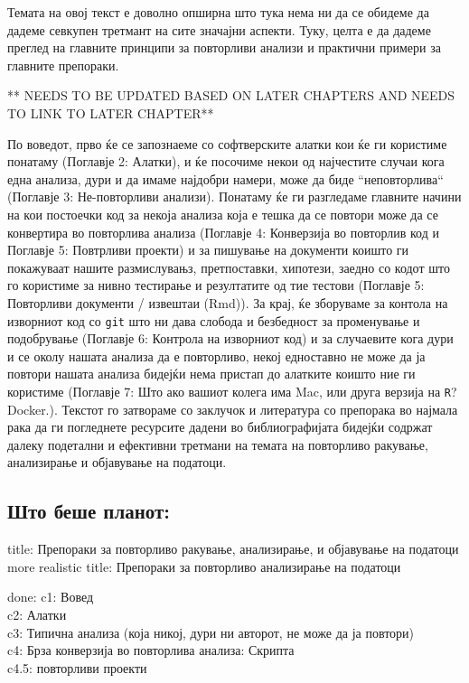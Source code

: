 \documentclass[
]{book}
\begin{document}
Темата на овој текст е доволно опширна што тука нема ни да се обидеме да дадеме севкупен третмант на сите значајни аспекти. Туку, целта е да дадеме преглед на главните принципи за повторливи анализи и практични примери за главните препораки.

** NEEDS TO BE UPDATED BASED ON LATER CHAPTERS AND NEEDS TO LINK TO LATER CHAPTER**

По воведот, прво ќе се запознаеме со софтверските алатки кои ќе ги користиме понатаму (Поглавје 2: Алатки), и ќе посочиме некои од најчестите случаи кога една анализа, дури и да имаме најдобри намери, може да биде ``неповторлива`` (Поглавје 3: Не-повторливи анализи). Понатаму ќе ги разгледаме главните начини на кои постоечки код за некоја анализа која е тешка да се повтори може да се конвертира во повторлива анализа (Поглавје 4: Конверзија во повторлив код и Поглавје 5: Повтрливи проекти) и за пишување на документи коишто ги покажуваат нашите размислувањз, претпоставки, хипотези, заедно со кодот што го користиме за нивно тестирање и резултатите од тие тестови (Поглавје 5: Повторливи документи / извештаи (Rmd)). За крај, ќе зборуваме за контола на изворниот код со \texttt{git} што ни дава слобода и безбедност за променување и подобрување (Поглавје 6: Контрола на изворниот код) и за случаевите кога дури и се околу нашата анализа да е повторливо, некој едноставно не може да ја повтори нашата анализа бидејќи нема пристап до алатките коишто ние ги користиме (Поглавје 7: Што ако вашиот колега има Mac, или друга верзија на \texttt{R}? Docker.). Текстот го затвораме со заклучок и литература со препорака во најмала рака да ги погледнете ресурсите дадени во библиографијата бидејќи содржат далеку подетални и ефективни третмани на темата на повторливо ракување, анализирање и објавување на податоци.

\hypertarget{ux448ux442ux43e-ux431ux435ux448ux435-ux43fux43bux430ux43dux43eux442}{%
\subsection{Што беше планот:}\label{ux448ux442ux43e-ux431ux435ux448ux435-ux43fux43bux430ux43dux43eux442}}

title: Препораки за повторливо ракување, анализирање, и објавување на податоци\\
more realistic title: Препораки за повторливо анализирање на податоци

done:
c1: Вовед\\
c2: Алатки\\
c3: Типична анализа (која никој, дури ни авторот, не може да ја повтори)\\
c4: Брза конверзија во повторлива анализа: Скрипта\\
c4.5: повторливи проекти
\end{document}
